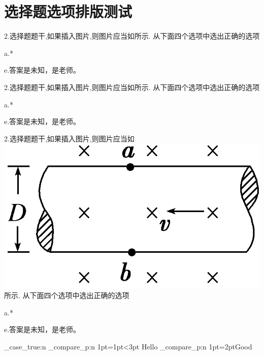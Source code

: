 \documentclass[a4paper,fontset = windows]{ctexbook}
\begin{document}
\chapter{选择题选项排版测试}

 \begin{choices}
   2.选择题题干,如果插入图片,则图片应当如所示.
    从下面四个选项中选出正确的选项

    a.*

    e.答案是未知，是老师。

   2.选择题题干,如果插入图片,则图片应当如所示.
    从下面四个选项中选出正确的选项

    a.*

    e.答案是未知，是老师。

   2.选择题题干,如果插入图片,则图片应当如\includegraphics{1.png}所示.
    从下面四个选项中选出正确的选项

    a.*

    e.答案是未知，是老师。

 \end{choices}


\ExplSyntaxOn
\bool_case_true:n
{
   {
      \dim_compare_p:n 
      {1pt=1pt<3pt}
   }
   {Hello}
   {\dim_compare_p:n {1pt=2pt}}{Good}
}
\ExplSyntaxOff


\makeanswer
\end{document}
